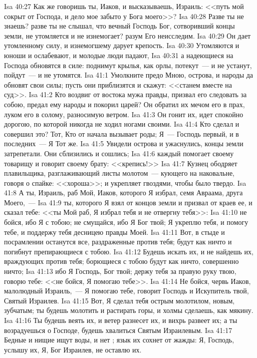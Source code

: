 \vs Isa 40:27 Как же говоришь ты, Иаков, и высказываешь, Израиль: <<путь мой сокрыт от Господа, и дело мое забыто у Бога моего>>?
\vs Isa 40:28 Разве ты не знаешь? разве ты не слышал, что вечный Господь Бог, сотворивший концы земли, не утомляется и не изнемогает? разум Его неисследим.
\vs Isa 40:29 Он дает утомленному силу, и изнемогшему дарует крепость.
\vs Isa 40:30 Утомляются и юноши и ослабевают, и молодые люди падают,
\vs Isa 40:31 а надеющиеся на Господа обновятся в силе: поднимут крылья, как орлы, потекут~--- и не устанут, пойдут~--- и не утомятся.
\vs Isa 41:1 Умолкните предо Мною, острова, и народы да обновят свои силы; пусть они приблизятся и скажут: <<станем вместе на суд>>.
\vs Isa 41:2 Кто воздвиг от востока мужа правды, призвал его следовать за собою, предал ему народы и покорил царей? Он обратил их мечом его в прах, луком его в солому, разносимую ветром.
\vs Isa 41:3 Он гонит их, идет спокойно дорогою, по которой никогда не ходил ногами своими.
\vs Isa 41:4 Кто сделал и совершил это? Тот, Кто от начала вызывает роды; Я~--- Господь первый, и в последних~--- Я Тот же.
\vs Isa 41:5 Увидели острова и ужаснулись, концы земли затрепетали. Они сблизились и сошлись;
\vs Isa 41:6 каждый помогает своему товарищу и говорит своему брату: <<крепись!>>
\vs Isa 41:7 Кузнец ободряет плавильщика, разглаживающий листы молотом~--- кующего на наковальне, говоря о спайке: <<хороша>>; и укрепляет гвоздями, чтобы было твердо.
\vs Isa 41:8 А ты, Израиль, раб Мой, Иаков, которого Я избрал, семя Авраама, друга Моего,~---
\vs Isa 41:9 ты, которого Я взял от концов земли и призвал от краев ее, и сказал тебе: <<ты Мой раб, Я избрал тебя и не отвергну тебя>>:
\vs Isa 41:10 не бойся, ибо Я с тобою; не смущайся, ибо Я Бог твой; Я укреплю тебя, и помогу тебе, и поддержу тебя десницею правды Моей.
\vs Isa 41:11 Вот, в стыде и посрамлении останутся все, раздраженные против тебя; будут как ничто и погибнут препирающиеся с тобою.
\vs Isa 41:12 Будешь искать их, и не найдешь их, враждующих против тебя; борющиеся с тобою будут как ничто, совершенно ничто;
\vs Isa 41:13 ибо Я Господь, Бог твой; держу тебя за правую руку твою, говорю тебе: <<не бойся, Я помогаю тебе>>.
\vs Isa 41:14 Не бойся, червь Иаков, малолюдный Израиль,~--- Я помогаю тебе, говорит Господь и Искупитель твой, Святый Израилев.
\vs Isa 41:15 Вот, Я сделал тебя острым молотилом, новым, зубчатым; ты будешь молотить и растирать горы, и холмы сделаешь, как мякину.
\vs Isa 41:16 Ты будешь веять их, и ветер разнесет их, и вихрь развеет их; а ты возрадуешься о Господе, будешь хвалиться Святым Израилевым.
\vs Isa 41:17 Бедные и нищие ищут воды, и нет ; язык их сохнет от жажды: Я, Господь, услышу их, Я, Бог Израилев, не оставлю их.
